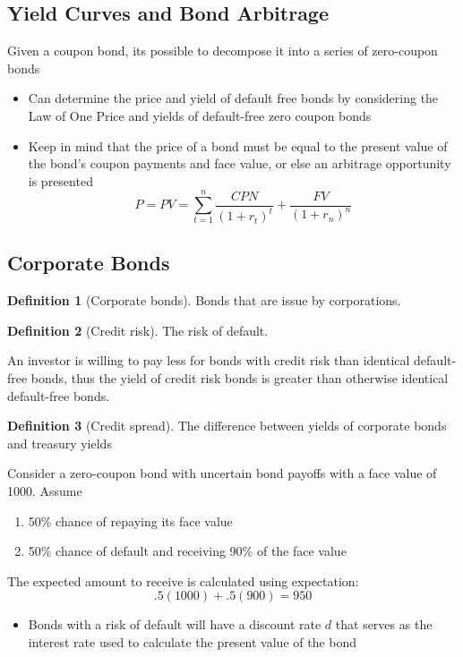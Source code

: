 \documentclass[11pt]{article}
\theoremstyle{definition}
\newtheorem*{definition}{Definition}
\begin{document}
\subsection{Yield Curves and Bond Arbitrage}
Given a coupon bond, its possible to decompose it into a series of zero-coupon bonds
\begin{itemize}
    \item Can determine the price and yield of default free bonds by considering the Law of One Price and yields of default-free zero coupon bonds
    \item Keep in mind that the price of a bond must be equal to the present value of the bond's coupon payments and face value, or else an arbitrage opportunity is presented
    \begin{equation*}
        P = PV = \sum_{t = 1}^n \frac{CPN}{(1 + r_t)^t} + \frac{FV}{(1 + r_n)^n}
    \end{equation*}
\end{itemize}

\subsection{Corporate Bonds}
\begin{definition}[Corporate bonds]
    Bonds that are issue by corporations.  
\end{definition}
\begin{definition}[Credit risk]
    The risk of default.
\end{definition}
An investor is willing to pay less for bonds with credit risk than identical default-free bonds, thus the yield of credit risk bonds is greater than otherwise identical default-free bonds. 
\begin{definition}[Credit spread]
    The difference between yields of corporate bonds and treasury yields
\end{definition}
Consider a zero-coupon bond with uncertain bond payoffs with a face value of 1000. Assume
\begin{enumerate}
    \item 50\% chance of repaying its face value
    \item 50\% chance of default and receiving 90\% of the face value
\end{enumerate}
The expected amount to receive is calculated using expectation:
\begin{equation*}
    .5(1000) + .5(900) = 950
\end{equation*}
\begin{itemize}
    \item Bonds with a risk of default will have a discount rate $d$ that serves as the interest rate used to calculate the present value of the bond
\end{itemize}
\end{document}
